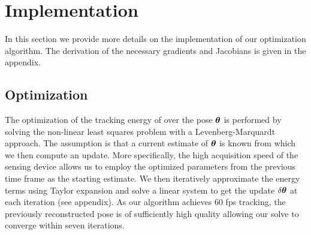 


\section{Implementation}
\label{sec:implementation}
%


In this section we provide more details on the implementation of our optimization algorithm. The derivation of the necessary gradients and Jacobians is given in the appendix.

\subsection*{Optimization} The optimization of the tracking energy of  over the pose $\boldsymbol{\theta}$ 
is performed by solving the non-linear least squares problem with a Levenberg-Marquardt approach. 
The assumption is that a current estimate of $\boldsymbol{\theta}$ is known from which we then compute an update. More specifically, the high acquisition speed of the sensing device allows us to employ the optimized parameters from the previous time frame as the starting estimate. We then iteratively approximate the energy terms using Taylor expansion and solve a linear system to get the update $\delta\boldsymbol{\theta}$ at each iteration (see appendix).
As our algorithm achieves 60 fps tracking, the previously reconstructed pose is of sufficiently high quality allowing our solve to converge within seven iterations.

